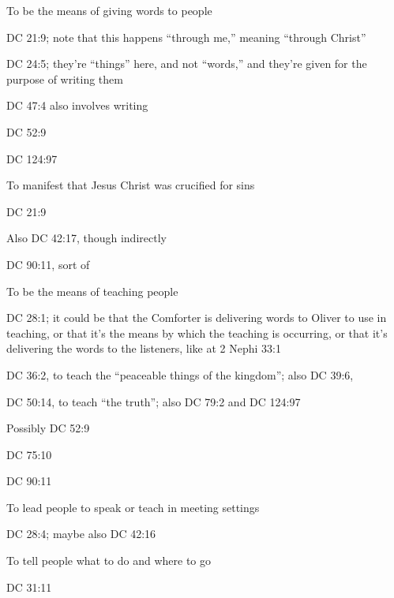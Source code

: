 		\begin{compactitem}
			\item To be the means of giving words to people
				\begin{compactitem}
					\item DC 21:9; note that this happens ``through me,'' meaning ``through Christ''
					\item DC 24:5; they're ``things'' here, and not ``words,'' and they're given for the purpose of writing them
					\item DC 47:4 also involves writing
					\item DC 52:9
					\item DC 124:97
				\end{compactitem}
			\item To manifest that Jesus Christ was crucified for sins
				\begin{compactitem}
					\item DC 21:9
					\item Also DC 42:17, though indirectly
					\item DC 90:11, sort of
				\end{compactitem}
			\item To be the means of teaching people 
				\begin{compactitem}
					\item DC 28:1; it could be that the Comforter is delivering words to Oliver to use in teaching, or that it's the means by which the teaching is occurring, or that it's delivering the words to the listeners, like at 2 Nephi 33:1
					\item DC 36:2, to teach the ``peaceable things of the kingdom''; also DC 39:6,
					\item DC 50:14, to teach ``the truth''; also DC 79:2 and DC 124:97
					\item Possibly DC 52:9
					\item DC 75:10
					\item DC 90:11
				\end{compactitem}
			\item To lead people to speak or teach in meeting settings
				\begin{compactitem}
					\item DC 28:4; maybe also DC 42:16
				\end{compactitem}
			\item To tell people what to do and where to go
				\begin{compactitem}
					\item DC 31:11

\end{compactitem}
\end{compactitem}
